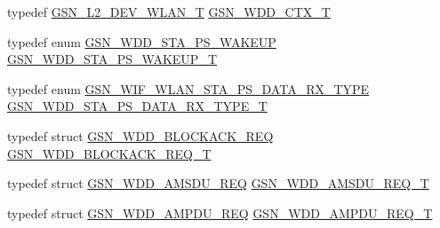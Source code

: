 \begin{DoxyCompactItemize}
\item 
typedef \hyperlink{a00108}{GSN\_\-L2\_\-DEV\_\-WLAN\_\-T} \hyperlink{a00603_ab461c9df9fc979702c542cabffbb2dba}{GSN\_\-WDD\_\-CTX\_\-T}
\item 
typedef enum \hyperlink{a00603_a6267ebdc154297cf5ca79d52aaa5e7ee}{GSN\_\-WDD\_\-STA\_\-PS\_\-WAKEUP} \hyperlink{a00603_ad4d84331dadc231fd291b26199b36691}{GSN\_\-WDD\_\-STA\_\-PS\_\-WAKEUP\_\-T}
\item 
typedef enum \hyperlink{a00603_a3b2419b27de31e09c69e0b3c17dde07d}{GSN\_\-WIF\_\-WLAN\_\-STA\_\-PS\_\-DATA\_\-RX\_\-TYPE} \hyperlink{a00603_a03ed769ea979937a8ce78d802646c729}{GSN\_\-WDD\_\-STA\_\-PS\_\-DATA\_\-RX\_\-TYPE\_\-T}
\item 
typedef struct \hyperlink{a00272}{GSN\_\-WDD\_\-BLOCKACK\_\-REQ} \hyperlink{a00603_ab7d53da5c96f5f0ec1b31894fdc02777}{GSN\_\-WDD\_\-BLOCKACK\_\-REQ\_\-T}
\item 
typedef struct \hyperlink{a00270}{GSN\_\-WDD\_\-AMSDU\_\-REQ} \hyperlink{a00603_a140aa60fdc6ee0c2ef0ad0e615453b01}{GSN\_\-WDD\_\-AMSDU\_\-REQ\_\-T}
\item 
typedef struct \hyperlink{a00269}{GSN\_\-WDD\_\-AMPDU\_\-REQ} \hyperlink{a00603_af3b1b212e8f1221473592d765ef07711}{GSN\_\-WDD\_\-AMPDU\_\-REQ\_\-T}
\end{DoxyCompactItemize}
